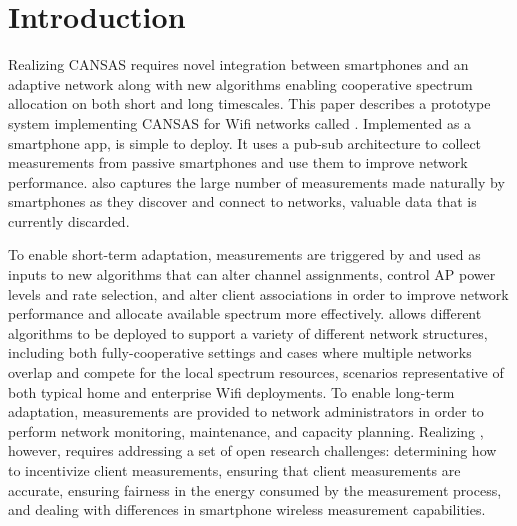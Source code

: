 \section{Introduction}


Realizing CANSAS requires novel integration between smartphones and an
adaptive network along with new algorithms enabling cooperative spectrum
allocation on both short and long timescales. This paper describes a
prototype system implementing CANSAS for Wifi networks called \PS{}.
Implemented as a smartphone app, \PS{} is simple to deploy. It uses a pub-sub
architecture to collect measurements from passive smartphones and use them to
improve network performance. \PS{} also captures the large number of
measurements made naturally by smartphones as they discover and connect to
networks, valuable data that is currently discarded.

To enable short-term adaptation, measurements are triggered by and used as
inputs to new algorithms that can alter channel assignments, control AP power
levels and rate selection, and alter client associations in order to improve
network performance and allocate available spectrum more effectively. \PS{}
allows different algorithms to be deployed to support a variety of different
network structures, including both fully-cooperative settings and cases where
multiple networks overlap and compete for the local spectrum resources,
scenarios representative of both typical home and enterprise Wifi
deployments. To enable long-term adaptation, measurements are provided to
network administrators in order to perform network monitoring, maintenance,
and capacity planning. Realizing \PS{}, however, requires addressing a set of
open research challenges: determining how to incentivize client measurements,
ensuring that client measurements are accurate, ensuring fairness in the
energy consumed by the measurement process, and dealing with differences in
smartphone wireless measurement capabilities.

